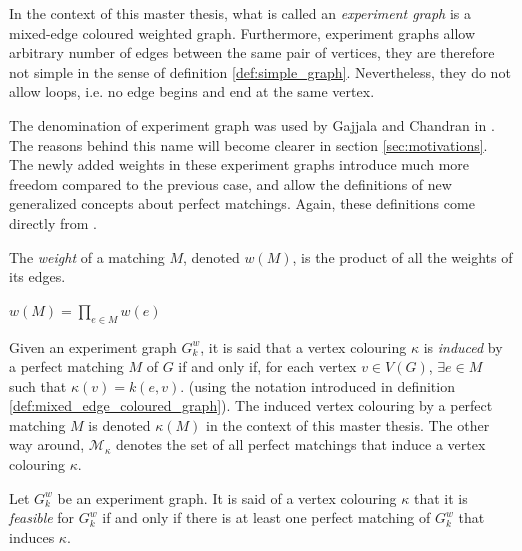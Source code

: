 \begin{definition}
    \label{def:experiment_graph}
    In the context of this master thesis, what is called an \textit{experiment graph} is a mixed-edge coloured weighted graph. Furthermore, experiment graphs allow arbitrary number of edges between the same pair of vertices, they are therefore not simple in the sense of definition \ref{def:simple_graph}. Nevertheless, they do not allow loops, i.e. no edge begins and end at the same vertex.
\end{definition}

The denomination of experiment graph was used by Gajjala and Chandran in \cite{chandran2023graphtheoretic}. The reasons behind this name will become clearer in section \ref{sec:motivations}. The newly added weights in these experiment graphs introduce much more freedom compared to the previous case, and allow the definitions of new generalized concepts about perfect matchings. Again, these definitions come directly from \cite{wordpress}.

\begin{definition}
    \label{def:matching_weight}
    The \textit{weight} of a matching $M$, denoted $w(M)$, is the product of all the weights of its edges.
    \begin{center}
        $w(M) = \prod\limits_{e \in M}w(e)$
    \end{center}
\end{definition}

\begin{definition}
    \label{def:induced_vertex_colouring}
    Given an experiment graph $G_k^w$, it is said that a vertex colouring $\kappa$ is \textit{induced} by a perfect matching $M$ of $G$ if and only if, for each vertex $v \in V(G)$, $\exists e \in M$ such that $\kappa(v) = k(e, v)$. (using the notation introduced in definition \ref{def:mixed_edge_coloured_graph}). The induced vertex colouring by a perfect matching $M$ is denoted $\kappa(M)$ in the context of this master thesis. The other way around, $\mathcal{M}_\kappa$ denotes the set of all perfect matchings that induce a vertex colouring $\kappa$.
\end{definition}

\begin{definition}
    \label{def:feasible_vertex_colouring}
    Let $G_k^w$ be an experiment graph. It is said of a vertex colouring $\kappa$ that it is \textit{feasible} for $G_k^w$ if and only if there is at least one perfect matching of $G_k^w$ that induces $\kappa$.
\end{definition}

